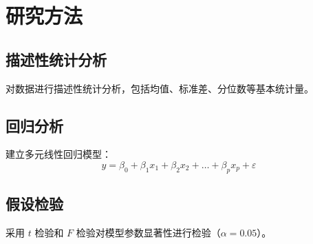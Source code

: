 \section{研究方法}

\subsection{描述性统计分析}

对数据进行描述性统计分析，包括均值、标准差、分位数等基本统计量。

\subsection{回归分析}

建立多元线性回归模型：
\begin{equation}
y = \beta_0 + \beta_1 x_1 + \beta_2 x_2 + \dots + \beta_p x_p + \varepsilon
  \label{eq:2-method-1}
\end{equation}

\subsection{假设检验}

采用 $t$ 检验和 $F$ 检验对模型参数显著性进行检验（$\alpha = 0.05$）。
